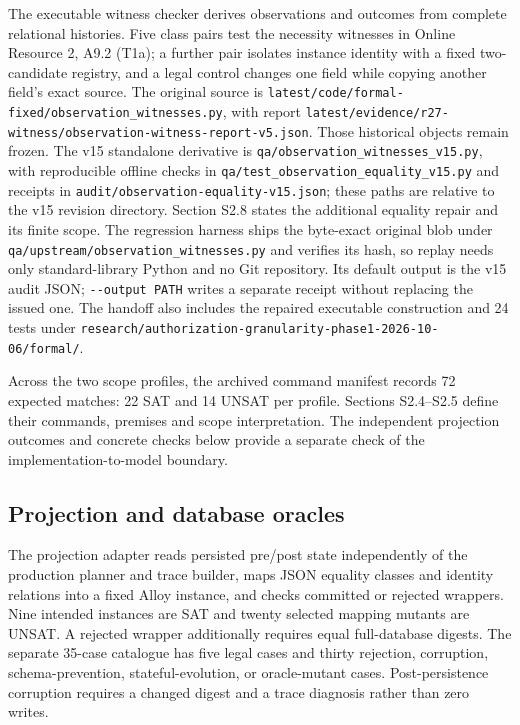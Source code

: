 \documentclass[11pt,a4paper]{article}
\newcommand{\code}[1]{\nolinkurl{#1}}
\begin{document}
The executable witness checker derives observations and outcomes from complete relational histories. Five class pairs test the necessity witnesses in Online Resource 2, A9.2 (T1a); a further pair isolates instance identity with a fixed two-candidate registry, and a legal control changes one field while copying another field's exact source. The original source is \code{latest/code/formal-fixed/observation_witnesses.py}, with report \code{latest/evidence/r27-witness/observation-witness-report-v5.json}. Those historical objects remain frozen. The v15 standalone derivative is \code{qa/observation_witnesses_v15.py}, with reproducible offline checks in \code{qa/test_observation_equality_v15.py} and receipts in \code{audit/observation-equality-v15.json}; these paths are relative to the v15 revision directory. Section S2.8 states the additional equality repair and its finite scope. The regression harness ships the byte-exact original blob under \code{qa/upstream/observation_witnesses.py} and verifies its hash, so replay needs only standard-library Python and no Git repository. Its default output is the v15 audit JSON; \texttt{-{}-output PATH} writes a separate receipt without replacing the issued one. The handoff also includes the repaired executable construction and 24 tests under \code{research/authorization-granularity-phase1-2026-10-06/formal/}.

Across the two scope profiles, the archived command manifest records 72 expected matches: 22 SAT and 14 UNSAT per profile. Sections S2.4--S2.5 define their commands, premises and scope interpretation. The independent projection outcomes and concrete checks below provide a separate check of the implementation-to-model boundary.

\subsection{Projection and database oracles}

The projection adapter reads persisted pre/post state independently of the production planner and trace builder, maps JSON equality classes and identity relations into a fixed Alloy instance, and checks committed or rejected wrappers. Nine intended instances are SAT and twenty selected mapping mutants are UNSAT. A rejected wrapper additionally requires equal full-database digests. The separate 35-case catalogue has five legal cases and thirty rejection, corruption, schema-prevention, stateful-evolution, or oracle-mutant cases. Post-persistence corruption requires a changed digest and a trace diagnosis rather than zero writes.
\end{document}

